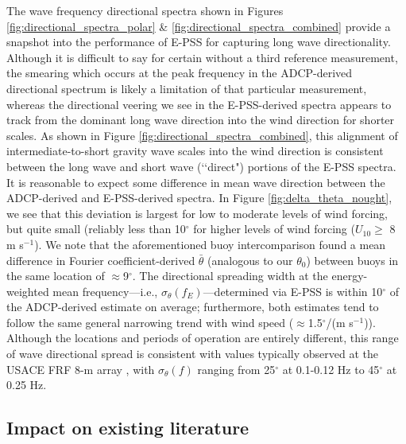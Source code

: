 \documentclass[letterpaper,journal]{IEEEtran}
\begin{document}
The wave frequency directional spectra shown in Figures \ref{fig:directional_spectra_polar} \& \ref{fig:directional_spectra_combined} provide a snapshot into the performance of E-PSS for capturing long wave directionality. Although it is difficult to say for certain without a third reference measurement, the smearing which occurs at the peak frequency in the ADCP-derived directional spectrum is likely a limitation of that particular measurement, whereas the directional veering we see in the E-PSS-derived spectra appears to track from the dominant long wave direction into the wind direction for shorter scales. As shown in Figure \ref{fig:directional_spectra_combined}, this alignment of intermediate-to-short gravity wave scales into the wind direction is consistent between the long wave and short wave (\lq\lq direct") portions of the E-PSS spectra. It is reasonable to expect some difference in mean wave direction between the ADCP-derived and E-PSS-derived spectra. In Figure \ref{fig:delta_theta_nought}, we see that this deviation is largest for low to moderate levels of wind forcing, but quite small (reliably less than 10$^{\circ}$ for higher levels of wind forcing ($U_{10}\geq$ 8 m s$^{-1}$). We note that the aforementioned buoy intercomparison \cite{jensen_quantifying_2021} found a mean difference in Fourier coefficient-derived $\bar{\theta}$ (analogous to our $\theta_0$) between buoys in the same location of $\approx$9$^{\circ}$. The directional spreading width at the energy-weighted mean frequency---i.e., $\sigma_\theta(f_E)$---determined via E-PSS is within 10$^{\circ}$ of the ADCP-derived estimate on average; furthermore, both estimates tend to follow the same general narrowing trend with wind speed ($\approx$1.5$^{\circ}$/(m s$^{-1}$)). Although the locations and periods of operation are entirely different, this range of wave directional spread is consistent with values typically observed at the USACE FRF 8-m array \cite{collins_performance_2024}, with $\sigma_\theta(f)$ ranging from 25$^{\circ}$ at 0.1-0.12 Hz to 45$^{\circ}$ at 0.25 Hz.

\subsection{Impact on existing literature}
\end{document}
